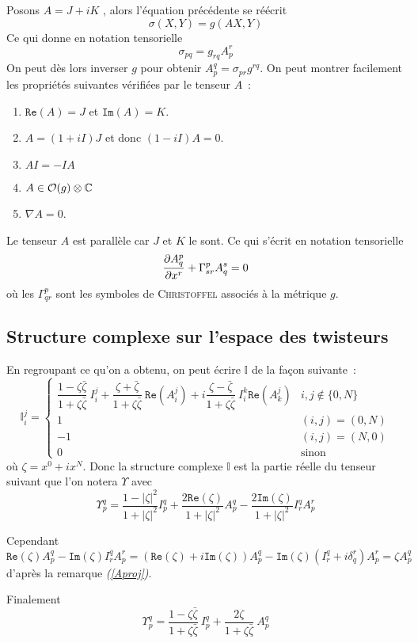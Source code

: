 \documentclass[12pt,draft]{article}
\renewcommand{\Re}{\texttt{Re}}
\renewcommand{\Im}{\texttt{Im}}
\begin{document}
Posons $A = J + iK$ \label{A}, alors l'équation précédente se réécrit
\[
\sigma(X,Y) = g(AX,Y)
\]
Ce qui donne en notation tensorielle
\[
\sigma_{pq} = g_{rq}A^r_p
\]
On peut dès lors inverser $g$ pour obtenir $A_p^q = \sigma_{pr}g^{rq}$. On peut montrer facilement les propriétés suivantes vérifiées par le tenseur $A$~:
\begin{enumerate}[\itshape (i)]
\item $\Re(A) = J$ et $\Im(A) = K$.\label{eqJ}
\item $A = (1 + iI)J$ et donc $(1-iI)A = 0$. \label{Aproj}
\item $AI =  -IA$
\item $A \in \mathcal{O}(g) \otimes \mathbb{C} $ 
\item $\nabla A = 0$.
\end{enumerate}
Le tenseur $A$ est parallèle car $J$ et $K$ le sont. Ce qui s'écrit en notation tensorielle
\[
\dfrac{\partial{A^p_q}}{\partial{x^r}} + \Gamma^p_{sr} A^s_q = 0
\]
où les $\Gamma^p_{qr}$ sont les symboles de \textsc{Christoffel} associés à la métrique $g$.

\subsection{Structure complexe sur l'espace des twisteurs}
En regroupant ce qu'on a obtenu, on peut écrire $\mathbb{I}$ de la façon suivante~:
\[
\mathbb{I}_i^j = \left\lbrace
\begin{array}{cr}
\dfrac{1-\zeta \bar{\zeta}}{1+\zeta \bar{\zeta}} \ I_i^j + \dfrac{\zeta + \bar{\zeta}}{1+\zeta \bar{\zeta}}\ \Re(A_i^j) + i\dfrac{\zeta - \bar{\zeta}}{1+\zeta \bar{\zeta}}\ I_i^k\Re(A_k^j)  & i,j \notin \{0,N\}\\ 
1 & (i,j) = (0,N)\\
-1 & (i,j) = (N,0)\\
0 & \text{sinon}
\end{array}\right.
\]
où $\zeta = x^0+ix^N$.
Donc la structure complexe $\mathbb{I}$ est la partie réelle du tenseur suivant que l'on notera $\Upsilon$ avec
\[
\Upsilon_p^q = 
\dfrac{1-|\zeta|^2}{1+|\zeta|^2}
I_p^q
+
\dfrac{2\Re(\zeta)}{1+|\zeta|^2}
A_p^q
-
\dfrac{2\Im(\zeta)}{1+|\zeta|^2}
I_r^qA_p^r
\]

Cependant
\[
\Re(\zeta)A_p^q-\Im(\zeta)I_r^qA_p^r = \left(\Re(\zeta)+i\Im(\zeta) \right)A_p^q - \Im(\zeta)\left(I_r^q+i\delta^r_q\right)A^r_p = \zeta A_p^q
\]
d'après la remarque \textit{(\ref{Aproj})}.

Finalement
\[
\Upsilon_p^q = \dfrac{1-\zeta \bar{\zeta}}{1+\zeta \bar{\zeta}}\ I_p^q + \dfrac{2\zeta}{1+\zeta \bar{\zeta}}\ A_p^q
\]
\end{document}
